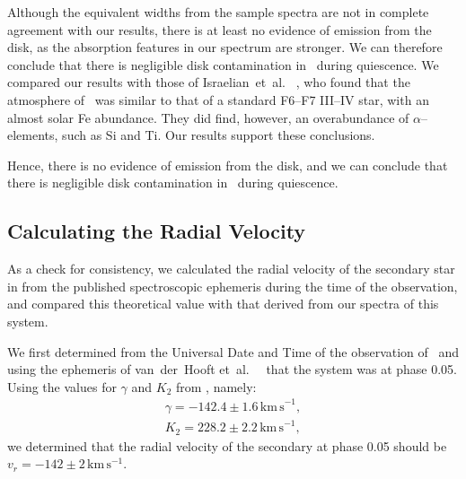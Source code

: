 \vspace{\myparskip}

Although the equivalent widths from the sample spectra are not in
complete agreement with our results, there is at least no evidence of
emission from the disk, as the absorption features in our spectrum are
stronger. We can therefore conclude that there is negligible disk
contamination in \groj\ during quiescence. We compared our results with those of Israelian~et~al.\ %
\citeyear{Israelian_et_al.:1999}%
, who found that the atmosphere of \groj\ was similar to that of a standard F6--F7 III--IV star, with an almost solar Fe abundance. They did find, however, an overabundance of $\alpha$--elements, such as Si and Ti. Our results support these conclusions. %

\vspace{\myparskip}

Hence, there is no evidence of emission from the disk, and we can conclude that there is negligible disk contamination in \groj\ during quiescence. %


\subsection{Calculating the Radial Velocity}
\label{cha:AccretionDiskContamination:sec:Spectroscopy:subsec:RadialVelocity}

As a check for consistency, we calculated the radial velocity of the
secondary star in \groj from the published spectroscopic ephemeris during the time of the observation, and compared
this theoretical value with that derived from our spectra of this
system. %

\vspace{\myparskip}

We first determined from the Universal Date and Time of
the observation of \groj\ and using the ephemeris of van~der~Hooft et~al.\ %
\citeyear{VanDerHooft_et_al.:1998}%
\ that the system was at phase 0.05. Using the values for $\gamma$ and
$K_2$ from %
%
, namely:
\begin{eqnarray}
\label{cha:AccretionDiskContamination:sec:Spectroscopy:subsec:RadialVelocity:eqn:values}
\gamma = -142.4\pm1.6\,\mathrm{km\,s}^{-1},\\
K_2 = 228.2\pm2.2\,\mathrm{km\,s}^{-1},
\end{eqnarray}
we determined that the radial velocity of the secondary at phase
0.05 should be $v_r = -142\pm2\,\mathrm{km}\,\mathrm{s}^{-1}$. %

